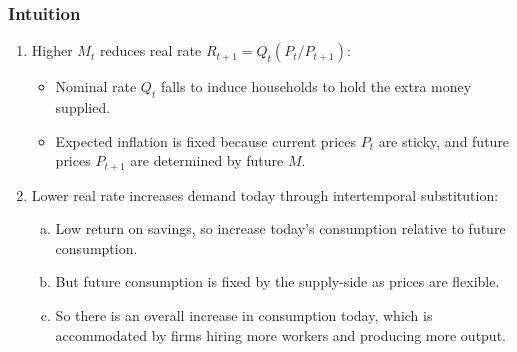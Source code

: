 \documentclass[english,xcolor=svgnames]{beamer}
\begin{document}
\begin{frame}
\frametitle{Intuition
}
\begin{enumerate}[1.]
	\item Higher $M_t$ reduces real rate $R_{t+1}=Q_t (P_t/P_{t+1})$:
	\begin{itemize}
		\item Nominal rate $Q_t$ falls to induce households to hold the extra money supplied.
		\item Expected inflation is fixed because current prices $P_t$ are sticky, and future prices $P_{t+1}$ are determined by future $M$.
	\end{itemize}
	\item Lower real rate increases demand today through intertemporal substitution:
	\begin{enumerate}[(a)]
		\item Low return on savings, so increase today's consumption relative to future consumption.
		\item But future consumption is fixed by the supply-side as prices are flexible.
		\item So there is an overall increase in consumption today, which is accommodated by firms hiring more workers and producing more output.
	\end{enumerate}
\end{enumerate}
\end{frame}
\end{document}

